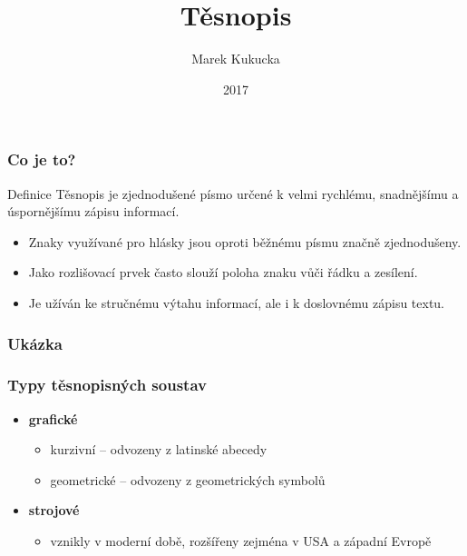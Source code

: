 \documentclass{beamer}
\title{Těsnopis}
\author{Marek Kukucka}
\institute{VUT v Brně}
\date{2017}
\begin{document}
\frame{\titlepage}
\begin{frame}
\frametitle{Co je to?}
\begin{block}{Definice}
Těsnopis je zjednodušené písmo určené k velmi rychlému, snadnějšímu a úspornějšímu zápisu informací.\end{block}
\end{frame}
\begin{frame}
\begin{itemize}
 \item Znaky využívané pro hlásky jsou oproti běžnému písmu značně zjednodušeny.
 \item Jako rozlišovací prvek často slouží poloha znaku vůči řádku a zesílení.
 \item Je užíván ke stručnému výtahu informací, ale i k doslovnému zápisu textu.
 \end{itemize}
\end{frame}

 \begin{frame}
 \frametitle{Ukázka}
 \begin{figure}
 \begin{center}
 \end{center}
 \end{figure}
\end{frame}


 \begin{frame}
    \frametitle{Typy těsnopisných soustav}
    \begin{itemize}[<+->]
        \item \textbf{grafické}
         \begin{itemize}[<.->]
            \item kurzivní – odvozeny z latinské abecedy
            \item geometrické – odvozeny z geometrických symbolů
         \end{itemize}
        \item \textbf{strojové} 
          \begin{itemize}[<.->]
            \item  vznikly v moderní době, rozšířeny zejména v USA a západní Evropě
         \end{itemize}
    \end{itemize}   
 \end{frame}
 
\end{document}
